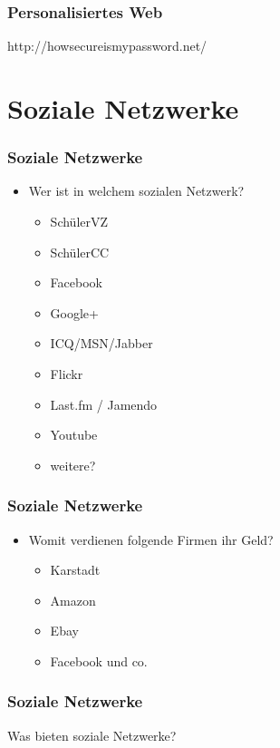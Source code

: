 \documentclass[12pt]{beamer}
\begin{document}
\begin{frame}
  \frametitle{Personalisiertes Web}
  \begin{center} \Large
     http://howsecureismypassword.net/
  \end{center}
\end{frame}

\section{Soziale Netzwerke}

\begin{frame}
  \frametitle{Soziale Netzwerke}

  \begin{itemize}
    \item Wer ist in welchem sozialen Netzwerk?
      \begin{itemize}
        \item SchülerVZ
        \item SchülerCC
        \item Facebook
        \item Google+
        \item ICQ/MSN/Jabber
        \item Flickr
        \item Last.fm / Jamendo
        \item Youtube
        \item weitere?
      \end{itemize}
  \end{itemize}
\end{frame}

\begin{frame}
  \frametitle{Soziale Netzwerke}

  \begin{itemize}
    \item Womit verdienen folgende Firmen ihr Geld?
      \begin{itemize}
        \item<2-> Karstadt
        \item<3-> Amazon
        \item<4-> Ebay
        \item<5-> Facebook und co.
      \end{itemize}
  \end{itemize}
\end{frame}

\begin{frame}
  \frametitle{Soziale Netzwerke}

  \begin{center} \Large
     Was bieten soziale Netzwerke?
  \end{center}
\end{frame}
\end{document}
